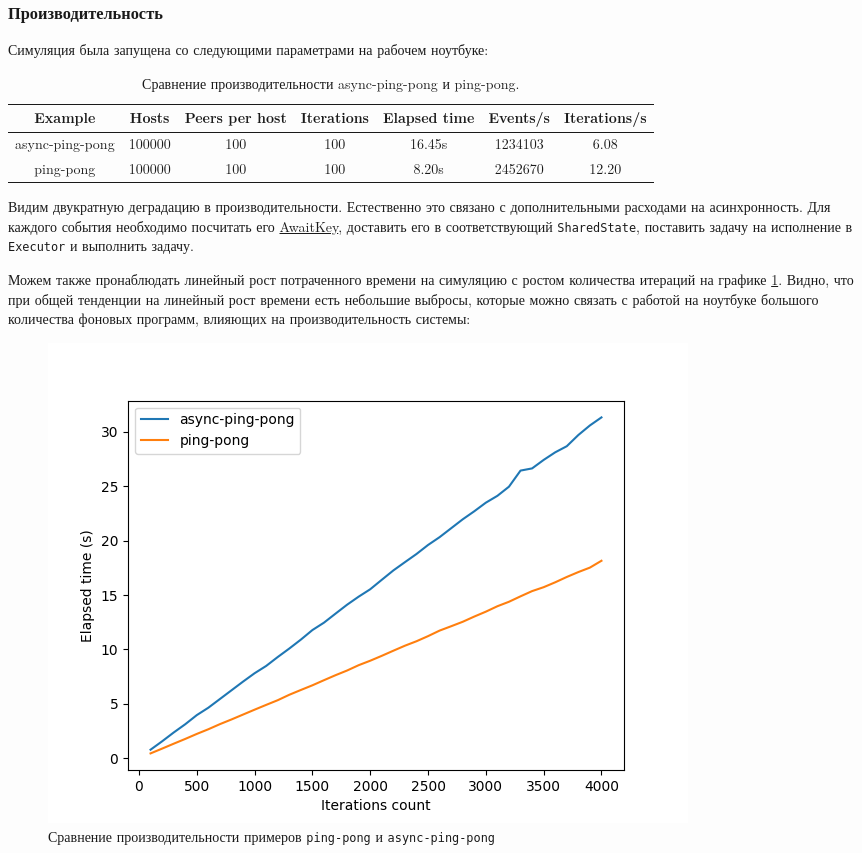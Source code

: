 \subsubsection{Производительность}

Симуляция была запущена со следующими параметрами на рабочем ноутбуке:
\begin{table}[H]
    \centering
    \begin{tabular}{|c|c|c|c|c|c|c|}
        \hline
        Example & Hosts & Peers per host & Iterations & Elapsed time & Events/s & Iterations/s \\
        \hline
        async-ping-pong & 100000 & 100 & 100 & 16.45s & 1234103 & 6.08\\
        \hline
        ping-pong & 100000 & 100 & 100 & 8.20s & 2452670 & 12.20\\
        \hline
    \end{tabular}
    \caption{Сравнение производительности async-ping-pong и ping-pong.}
    \label{cmp:ping-pong}
\end{table}

Видим двукратную деградацию в производительности. Естественно это связано с дополнительными расходами на асинхронность. Для каждого события необходимо посчитать его \hyperref[awaitkey]{AwaitKey}, доставить его в соответствующий \texttt{SharedState}, поставить задачу на исполнение в \texttt{Executor} и выполнить задачу.

Можем также пронаблюдать линейный рост потраченного времени на симуляцию с ростом количества итераций на графике \ref{async-perf}. Видно, что при общей тенденции на линейный рост времени есть небольшие выбросы, которые можно связать с работой на ноутбуке большого количества фоновых программ, влияющих на производительность системы:
\begin{figure}[H]
    \centering
    \includegraphics[width=0.9\linewidth]{images/async-ping-pong.png}
    \caption{Сравнение производительности примеров \texttt{ping-pong} и \texttt{async-ping-pong}}
    \label{async-perf}
\end{figure}

